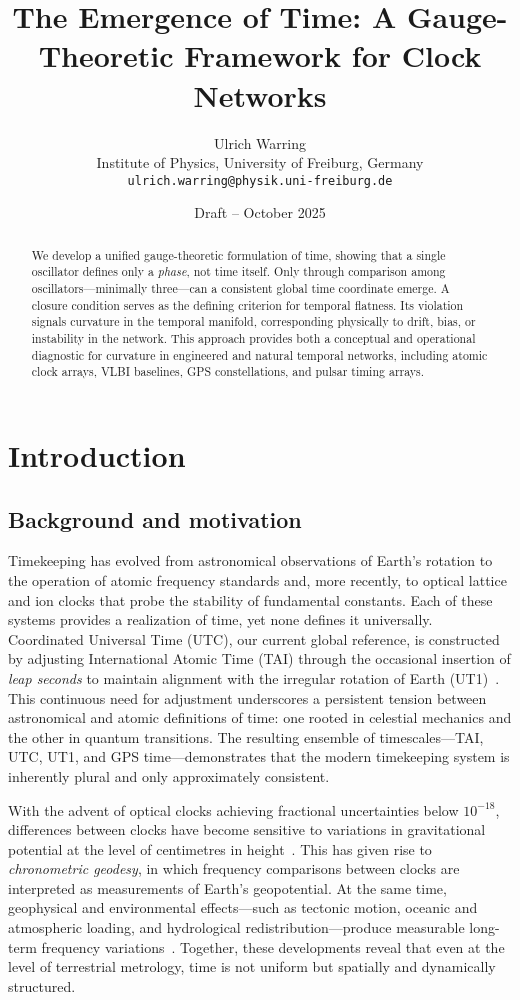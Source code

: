 \documentclass[11pt,a4paper]{article}
\title{\textbf{The Emergence of Time: A Gauge-Theoretic Framework for Clock Networks}}
\author{Ulrich Warring \\[2mm]
\small Institute of Physics, University of Freiburg, Germany \\[1mm]
\small \texttt{ulrich.warring@physik.uni-freiburg.de}}
\date{Draft -- October 2025}
\begin{document}
\maketitle

\begin{abstract}
We develop a unified gauge-theoretic formulation of time, showing that a single oscillator defines only a \emph{phase}, not time itself. 
Only through comparison among oscillators---minimally three---can a consistent global time coordinate emerge. 
A closure condition serves as the defining criterion for temporal flatness. 
Its violation signals curvature in the temporal manifold, corresponding physically to drift, bias, or instability in the network. 
This approach provides both a conceptual and operational diagnostic for curvature in engineered and natural temporal networks, including atomic clock arrays, VLBI baselines, GPS constellations, and pulsar timing arrays.
\end{abstract}

\section{Introduction}

\subsection*{Background and motivation}

Timekeeping has evolved from astronomical observations of Earth's rotation to the operation of atomic frequency standards and, more recently, to optical lattice and ion clocks that probe the stability of fundamental constants. 
Each of these systems provides a realization of time, yet none defines it universally. 
Coordinated Universal Time (UTC), our current global reference, is constructed by adjusting International Atomic Time (TAI) through the occasional insertion of \emph{leap seconds} to maintain alignment with the irregular rotation of Earth (UT1)~\citep{Guinot2011,Seidelmann2002}. 
This continuous need for adjustment underscores a persistent tension between astronomical and atomic definitions of time: one rooted in celestial mechanics and the other in quantum transitions. 
The resulting ensemble of timescales—TAI, UTC, UT1, and GPS time—demonstrates that the modern timekeeping system is inherently plural and only approximately consistent.

With the advent of optical clocks achieving fractional uncertainties below $10^{-18}$, differences between clocks have become sensitive to variations in gravitational potential at the level of centimetres in height~\citep{Lodewyck2019,Delva2019}. 
This has given rise to \emph{chronometric geodesy}, in which frequency comparisons between clocks are interpreted as measurements of Earth's geopotential. 
At the same time, geophysical and environmental effects—such as tectonic motion, oceanic and atmospheric loading, and hydrological redistribution—produce measurable long-term frequency variations~\citep{Petit2014}. 
Together, these developments reveal that even at the level of terrestrial metrology, time is not uniform but spatially and dynamically structured.
\end{document}
